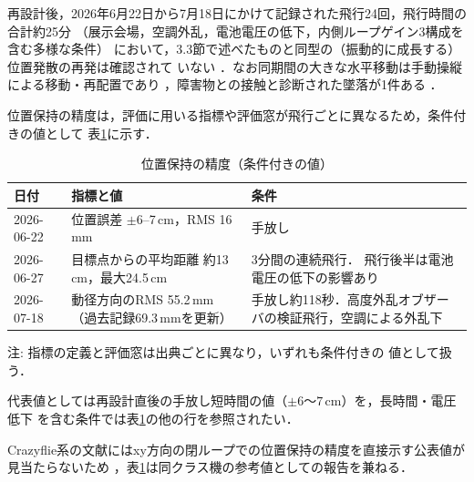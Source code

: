 \documentclass[a4paper,twocolumn,10pt]{ltjsarticle}
\begin{document}
再設計後，2026年6月22日から7月18日にかけて記録された飛行24回，飛行時間の合計約25分
（展示会場，空調外乱，電池電圧の低下，内側ループゲイン3構成を含む多様な条件）
において，3.3節で述べたものと同型の（振動的に成長する）位置発散の再発は確認されて
いない
．なお同期間の大きな水平移動は手動操縦による移動・再配置であり
，障害物との接触と診断された墜落が1件ある
．

位置保持の精度は，評価に用いる指標や評価窓が飛行ごとに異なるため，条件付きの値として
表\ref{tab:hold_accuracy}に示す．

\begin{table}[t]
\centering\scriptsize
\caption{位置保持の精度（条件付きの値）}
\label{tab:hold_accuracy}
\begin{tabular}{@{}p{1.4cm}p{2.5cm}p{2.6cm}@{}}
\toprule
日付 & 指標と値 & 条件 \\
\midrule
2026-06-22 & 位置誤差 $\pm6$--7\,cm，RMS 16\,mm & 手放し \\
2026-06-27 & 目標点からの平均距離 約13\,cm，最大24.5\,cm & 3分間の連続飛行．
飛行後半は電池電圧の低下の影響あり \\
2026-07-18 & 動径方向のRMS 55.2\,mm（過去記録69.3\,mmを更新） &
手放し約118秒．高度外乱オブザーバの検証飛行，空調による外乱下 \\
\bottomrule
\end{tabular}

\vspace{2pt}
\raggedright{\scriptsize 注: 指標の定義と評価窓は出典ごとに異なり，いずれも条件付きの
値として扱う．}
\end{table}

代表値としては再設計直後の手放し短時間の値（$\pm 6$〜$7$\,cm）を，長時間・電圧低下
を含む条件では表\ref{tab:hold_accuracy}の他の行を参照されたい．

Crazyflie系の文献にはxy方向の閉ループでの位置保持の精度を直接示す公表値が
見当たらないため
，表\ref{tab:hold_accuracy}は同クラス機の参考値としての報告を兼ねる．
\end{document}
